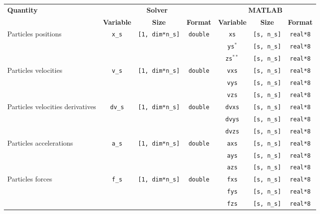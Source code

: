{\footnotesize
\begin{tabular}{|l|c|c|c|c|c|c|}%
\hline
\multirow{2}{*}{\bf Quantity} & \multicolumn{3}{c|}{\bf Solver} &\multicolumn{3}{c|}{\bf MATLAB} \\ \cline{2-7}
& {\bf Variable} & {\bf Size} & {\bf Format} & {\bf Variable} & {\bf Size} & {\bf Format} \\ \hline
\multirow{3}{1in}{Particles positions} & \multirow{3}{*}{\texttt{x\_s}} & \multirow{3}{*}{\texttt{[1, dim*n\_s]}} & \multirow{3}{*}{\texttt{double}} & \texttt{xs} & \texttt{[s, n\_s]}& \texttt{real*8}\\ \cline{5-7}
& & & & \texttt{ys}$^*$ & \texttt{[s, n\_s]}& \texttt{real*8} \\ \cline{5-7}
& & & & \texttt{zs}$^{**}$ & \texttt{[s, n\_s]}& \texttt{real*8} \\ \hline
\multirow{3}{1in}{Particles velocities} & \multirow{3}{*}{\texttt{v\_s}} & \multirow{3}{*}{\texttt{[1, dim*n\_s]}} & \multirow{3}{*}{\texttt{double}} & \texttt{vxs} & \texttt{[s, n\_s]}& \texttt{real*8}\\ \cline{5-7}
& & & & \texttt{vys} & \texttt{[s, n\_s]}& \texttt{real*8} \\ \cline{5-7}
& & & & \texttt{vzs} & \texttt{[s, n\_s]}& \texttt{real*8} \\ \hline
\multirow{3}{1in}{Particles velocities derivatives} & \multirow{3}{*}{\texttt{dv\_s}} & \multirow{3}{*}{\texttt{[1, dim*n\_s]}} & \multirow{3}{*}{\texttt{double}} & \texttt{dvxs} & \texttt{[s, n\_s]}& \texttt{real*8}\\ \cline{5-7}
& & & & \texttt{dvys} & \texttt{[s, n\_s]}& \texttt{real*8} \\ \cline{5-7}
& & & & \texttt{dvzs} & \texttt{[s, n\_s]}& \texttt{real*8} \\ \hline
\multirow{3}{1in}{Particles accelerations} & \multirow{3}{*}{\texttt{a\_s}} & \multirow{3}{*}{\texttt{[1, dim*n\_s]}} & \multirow{3}{*}{\texttt{double}} & \texttt{axs} & \texttt{[s, n\_s]}& \texttt{real*8}\\ \cline{5-7}
& & & & \texttt{ays} & \texttt{[s, n\_s]}& \texttt{real*8} \\ \cline{5-7}
& & & & \texttt{azs} & \texttt{[s, n\_s]}& \texttt{real*8} \\ \hline
\multirow{3}{1in}{Particles forces} & \multirow{3}{*}{\texttt{f\_s}} & \multirow{3}{*}{\texttt{[1, dim*n\_s]}} & \multirow{3}{*}{\texttt{double}} & \texttt{fxs} & \texttt{[s, n\_s]}& \texttt{real*8}\\ \cline{5-7}
& & & & \texttt{fys} & \texttt{[s, n\_s]}& \texttt{real*8} \\ \cline{5-7}
& & & & \texttt{fzs} & \texttt{[s, n\_s]}& \texttt{real*8} \\ \hline
\end{tabular}
}

